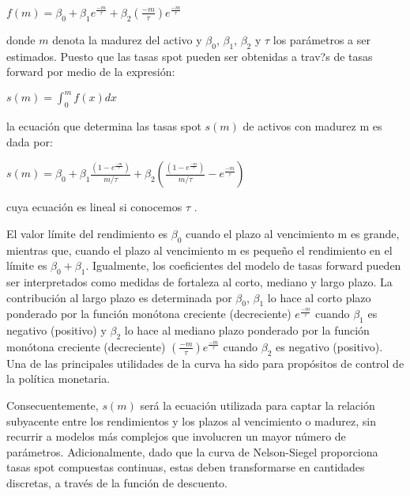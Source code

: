 \begin{center}
$\displaystyle{f(m) = \beta_{0} + \beta_{1} e^{\frac{-m}{\tau}} +\beta_{2} \left(\frac{-m}{\tau}\right)e^{\frac{-m}{\tau}}}$
\end{center}

\noindent donde $m$ denota la madurez del activo y $\beta_{0}$, $\beta_{1}$, $\beta_{2}$ y $\tau$ los par\'ametros a ser
estimados. Puesto que las tasas spot pueden ser obtenidas a trav?s de tasas
forward por medio de la expresi\'on:

\begin{center}
$\displaystyle{s(m) = \int_{0}^{m}f(x)dx}$
\end{center}

\noindent la ecuaci\'on que determina las tasas spot $s(m)$ de activos con madurez m es dada por:

\begin{center}
$\displaystyle{s(m) = \beta_{0}+ \beta_{1}\frac{\left(1-e^\frac{-m}{\tau}\right)}{m/\tau} + \beta_{2} \left(\frac{\left(1-e^\frac{-m}{\tau}\right)}{m/\tau} -  e^\frac{-m}{\tau}\right)}$
\end{center}


\noindent cuya ecuaci\'on es lineal si conocemos $\tau$ .

\hspace*{0.4 cm} El valor l\'imite del rendimiento es $\beta_{0}$ cuando el plazo al vencimiento m es grande, mientras que, cuando el plazo al vencimiento m es peque\~no el
rendimiento en el l\'imite es $\beta_{0}+\beta_{1}$. Igualmente, los coeficientes del
modelo de tasas forward pueden ser interpretados como medidas de
fortaleza al corto, mediano y largo plazo. La contribuci\'on al largo plazo
es determinada por $\beta_{0}$, $\beta_{1}$ lo hace al corto plazo ponderado por la
funci\'on mon\'otona creciente (decreciente) $e^{\frac{-m}{\tau}}$ cuando $\beta_{1}$ es negativo
(positivo) y $\beta_{2}$ lo hace al mediano plazo ponderado por la funci\'on
mon\'otona creciente (decreciente) $(\frac{-m}{\tau}) e^{\frac{-m}{\tau}}$ cuando $\beta_{2}$ es negativo
(positivo). Una de las principales utilidades de la curva ha sido para
prop\'ositos de control de la pol\'itica monetaria.

\hspace*{0.4 cm} Consecuentemente, $s(m)$ ser\'a la ecuaci\'on utilizada para captar la relaci\'on
subyacente entre los rendimientos y los plazos al vencimiento o madurez,
sin recurrir a modelos m\'as complejos que involucren un mayor n\'umero
de par\'ametros. Adicionalmente, dado que la curva de Nelson-Siegel
proporciona tasas spot compuestas continuas, estas deben transformarse
en cantidades discretas, a trav\'es de la funci\'on de descuento.


